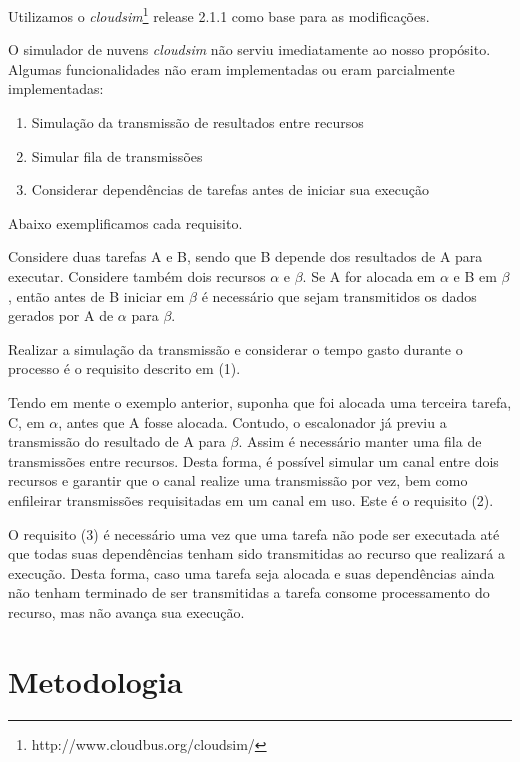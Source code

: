 \documentclass[a4paper,10pt]{article}
\begin{document}
Utilizamos o \emph{cloudsim}\footnote{http://www.cloudbus.org/cloudsim/} release 2.1.1 como base para as modificações.
 
O simulador de nuvens \emph{cloudsim} não serviu imediatamente ao nosso propósito. Algumas funcionalidades
não eram implementadas ou eram parcialmente implementadas:

\begin{enumerate}

  \item Simulação da transmissão de resultados entre recursos
  \item Simular fila de transmissões
  \item Considerar dependências de tarefas antes de iniciar sua execução

\end{enumerate}

Abaixo exemplificamos cada requisito.

Considere duas tarefas A e B, sendo que B depende dos resultados de A para executar.
Considere também dois recursos $\alpha$ e $\beta$.
Se A for alocada em $\alpha$ e B em $\beta$, então antes de B iniciar em $\beta$ é necessário
que sejam transmitidos os dados gerados por A de $\alpha$ para $\beta$.

Realizar a simulação da transmissão e considerar o tempo gasto durante o processo é o
requisito descrito em (1).

Tendo em mente o exemplo anterior, suponha que foi alocada uma terceira tarefa, C, em
$\alpha$, antes que A fosse alocada. Contudo, o escalonador já previu a transmissão do
resultado de A para $\beta$. Assim é necessário manter uma fila de transmissões entre
recursos. Desta forma, é possível simular um canal entre dois recursos e garantir que
o canal realize uma transmissão por vez, bem como enfileirar transmissões requisitadas
em um canal em uso. Este é o requisito (2).

O requisito (3) é necessário uma vez que uma tarefa não pode ser executada até que todas
suas dependências tenham sido transmitidas ao recurso que realizará a execução. Desta forma,
caso uma tarefa seja alocada e suas dependências ainda não tenham terminado de ser transmitidas
a tarefa consome processamento do recurso, mas não avança sua execução.

\section{Metodologia}
\end{document}
